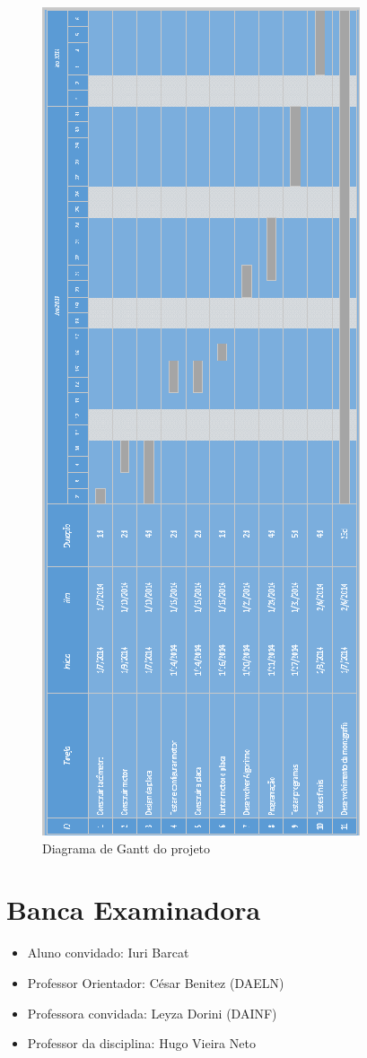 \begin{figure}[!h]
	\centering
	\includegraphics{./Diagrama_Gantt.png}
	\caption[Diagrama de Gantt do projeto]{Diagrama de Gantt do projeto}
	\label{fig:Diagrama_Gantt}
\end{figure}

\section{Banca Examinadora}
\begin{itemize}
\item Aluno convidado:
Iuri Barcat
\item Professor Orientador:
César Benitez (DAELN)
\item Professora convidada:
Leyza Dorini (DAINF)
\item Professor da disciplina:
Hugo Vieira Neto
\end{itemize} 